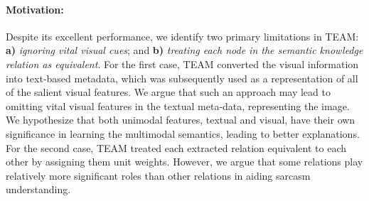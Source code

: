 \paragraph{Motivation:} Despite its excellent performance, we identify two primary limitations in TEAM: \textbf{a)} \textit{ignoring vital visual cues}; and \textbf{b)} \textit{treating each node in the semantic knowledge relation as equivalent}. For the first case, TEAM converted the visual information into text-based metadata, which was subsequently used as a representation of all of the salient visual features. We argue that such an approach may lead to omitting vital visual features in the textual meta-data, representing the image. We hypothesize that both unimodal features, textual and visual, have their own significance in learning the multimodal semantics, leading to better explanations. For the second case, TEAM \cite{jing-etal-2023-multi} treated each extracted relation equivalent to each other by assigning them unit weights. However, we argue that some relations play relatively more significant roles than other relations in aiding sarcasm understanding.




